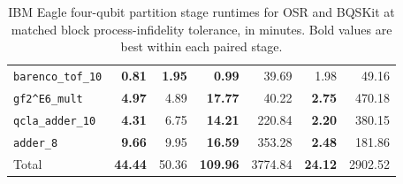 \begin{table}[p]
\begin{tabular}{l|rrr|rrr}
\texttt{barenco\_tof\_10} & \textbf{0.81} & \textbf{1.95} & \textbf{0.99} & 39.69 & 1.98 & 49.16 \\
\texttt{gf2\textasciicircum{}E6\_mult} & \textbf{4.97} & 4.89 & \textbf{17.77} & 40.22 & \textbf{2.75} & 470.18 \\
\texttt{qcla\_adder\_10} & \textbf{4.31} & 6.75 & \textbf{14.21} & 220.84 & \textbf{2.20} & 380.15 \\
\texttt{adder\_8} & \textbf{9.66} & 9.95 & \textbf{16.59} & 353.28 & \textbf{2.48} & 181.86 \\
\hline
Total & \textbf{44.44} & 50.36 & \textbf{109.96} & 3774.84 & \textbf{24.12} & 2902.52 \\
\hline
\end{tabular}
\caption{IBM Eagle four-qubit partition stage runtimes for OSR and BQSKit at matched block process-infidelity tolerance, in minutes. Bold values are best within each paired stage.}
\label{tab:osr-bqskit-four-qubit-ibm-eagle-times}
\end{table}

